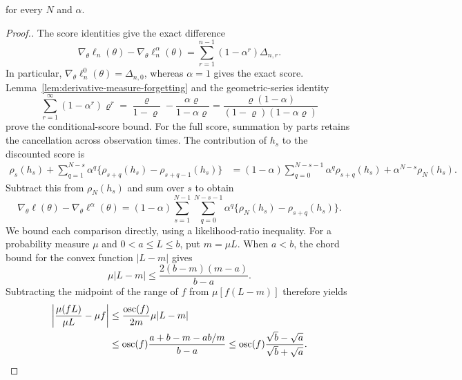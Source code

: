 \documentclass[11pt]{article}
\theoremstyle{thmstylethree}%
\begin{document}
{\begin{lem}
for every $N$ and $\alpha$.
\end{lem}
\endgraf
\begin{proof}[Proof.]
The score identities give the exact difference
\begin{equation}
\nabla_\theta\ell_n(\theta)-\nabla_\theta\ell_n^\alpha(\theta)
=\sum_{r=1}^{n-1}(1-\alpha^r)\Delta_{n,r}.
\label{eq:population-discount-lag-difference}
\end{equation}
In particular, $\nabla_\theta\ell_n^0(\theta)=\Delta_{n,0}$, whereas
$\alpha=1$ gives the exact score. Lemma~\ref{lem:derivative-measure-forgetting}
and the geometric-series identity
\begin{equation}
\sum_{r=1}^\infty(1-\alpha^r)\varrho^r
=\frac{\varrho}{1-\varrho}-\frac{\alpha\varrho}{1-\alpha\varrho}
=\frac{\varrho(1-\alpha)}{(1-\varrho)(1-\alpha\varrho)}
\end{equation}
prove the conditional-score bound.
\endgraf
For the full score, summation by parts retains the cancellation across
observation times. The contribution of $h_s$ to the discounted score is
\begin{align}
\rho_s(h_s)+\sum_{q=1}^{N-s}\alpha^q
\{\rho_{s+q}(h_s)-\rho_{s+q-1}(h_s)\}
&=(1-\alpha)\sum_{q=0}^{N-s-1}\alpha^q\rho_{s+q}(h_s)
+\alpha^{N-s}\rho_N(h_s).
\label{eq:population-discount-summation-by-parts}
\end{align}
Subtract this from $\rho_N(h_s)$ and sum over $s$ to obtain
\begin{equation}
\nabla_\theta\ell(\theta)-\nabla_\theta\ell^\alpha(\theta)
=(1-\alpha)\sum_{s=1}^{N-1}\sum_{q=0}^{N-s-1}\alpha^q
\{\rho_N(h_s)-\rho_{s+q}(h_s)\}.
\label{eq:population-discount-full-boundary-comparison}
\end{equation}
We bound each comparison directly, using a likelihood-ratio inequality.
For a probability measure $\mu$ and $0<a\leq L\leq b$, put $m=\mu L$.
When $a<b$, the chord bound for the convex function $|L-m|$ gives
\begin{equation}
\mu|L-m|\leq\frac{2(b-m)(m-a)}{b-a}.
\label{eq:population-discount-likelihood-chord}
\end{equation}
Subtracting the midpoint of the range of $f$ from
$\mu[f(L-m)]$ therefore yields
\begin{align}
\left|\frac{\mu(fL)}{\mu L}-\mu f\right|
&\leq\frac{\operatorname{osc}(f)}{2m}\mu|L-m|\notag\\
&\leq\operatorname{osc}(f)\frac{a+b-m-ab/m}{b-a}
\leq\operatorname{osc}(f)\frac{\sqrt b-\sqrt a}{\sqrt b+\sqrt a}.
\label{eq:population-discount-bayes-range-bound}

\end{align}
\end{proof}}
\end{document}
